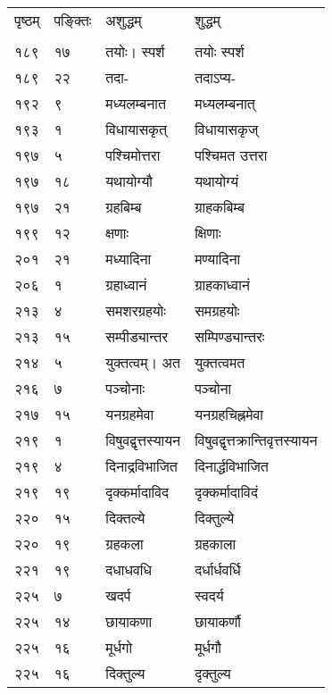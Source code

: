 \documentclass[11pt, openany]{book}
\begin{document}
\begin{longtable}{p{1cm} p{1.5cm} p{4cm} p{4cm}}
पृष्ठम् & पङ्क्तिः & अशुद्धम् & शुद्धम्\\
\vspace{2mm}\\

 १८९ & १७ & तयोः। स्पर्श & तयोः स्पर्श \\

 १८९ & २२ & तदा- & तदाऽप्य- \\

 १९२ & ९ & मध्यलम्बनात & मध्यलम्बनात् \\

 १९३ & १ & विधायासकृत् & विधायासकृज् \\

 १९७ & ५ & पश्चिमोत्तरा & पश्चिमत उत्तरा \\

 १९७ & १८ & यथायोग्यौ & यथायोग्यं \\

 १९७ & २१ & ग्रहबिम्ब & ग्राहकबिम्ब \\

 १९९ & १२ & क्षणाः & क्षिणाः \\

 २०१ & २१ & मध्यादिना & मण्यादिना \\

 २०६ & १ & ग्रहाध्वानं & ग्राहकाध्वानं \\

 २१३ & ४ & समशरग्रहयोः & समग्रहयोः \\

 २१३ & १५ & सम्पीड्यान्तर & सम्पिण्ड्यान्तरः \\

 २१४ & ५ & युक्तत्वम्। अत & युक्तत्वमत \\

 २१६ & ७ & पञ्चोनाः & पञ्चोना \\

 २१७ & १५ & यनग्रहमेवा & यनग्रहचिह्नमेवा \\

 २१९ & १ & विषुवद्वृत्तस्यायन &
विषुवद्वृत्तक्रान्तिवृत्तस्यायन \\

 २१९ & ४ & दिनाद्रविभाजित & दिनार्द्धविभाजित \\

 २१९ & १९ & दृक्कर्मादाविद & दृक्कर्मादाविदं \\

 २२० & १५ & दिक्तल्ये & दिक्तुल्ये \\

 २२० & १९ & ग्रहकला & ग्रहकाला \\

 २२१ & १९ & दधाधवधि & दर्धार्धवर्धि \\

 २२५ & ७ & खदर्प & स्वदर्य \\

 २२५ & १४ & छायाकणा & छायाकर्णौ \\

 २२५ & १६ & मूर्धगो & मूर्धगौ \\

२२५ & १६ & दिक्तुल्य & दृक्तुल्य \\

\end{longtable}
\end{document}
